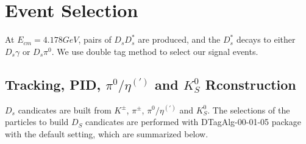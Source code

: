 \section{Event Selection}
\label{ST-selection}
At $E_{cm} = 4.178 GeV$, pairs of $D_{s}D_{s}^{*}$ are produced,  and the $D_{s}^{*}$ decays to either $D_{s}\gamma$ or $D_{s}\pi^{0}$.  We use double tag method to select our signal events.


\subsection{Tracking, PID, $\pi^{0}/\eta^{(')}$ and $K_{S}^{0}$ Rconstruction }
$D_{s}$ candicates are built from $K^{\pm}$, $\pi^{\pm}$, $\pi^{0}/\eta^{(')}$ and $K_{S}^{0}$. The selections of the particles to build $D_{S}$ candicates are performed with DTagAlg-00-01-05 package with the default setting, which are summarized below.

